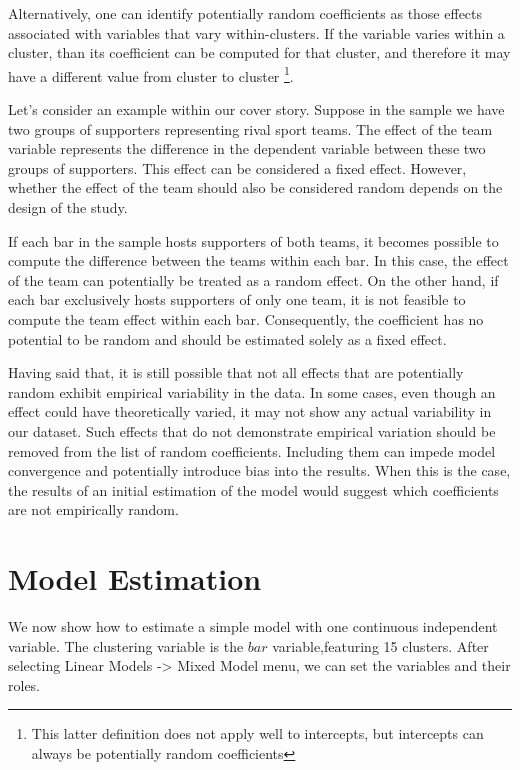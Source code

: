 \documentclass[
]{book}
\begin{document}
Alternatively, one can identify potentially random coefficients as those effects associated with variables that vary within-clusters. If the variable varies within a cluster, than its coefficient can be computed for that cluster, and therefore it may have a different value from cluster to cluster \footnote{This latter definition does not apply well to intercepts, but intercepts can always be potentially random coefficients}.

Let's consider an example within our cover story. Suppose in the sample we have two groups of supporters representing rival sport teams. The effect of the team variable represents the difference in the dependent variable between these two groups of supporters. This effect can be considered a fixed effect. However, whether the effect of the team should also be considered random depends on the design of the study.

If each bar in the sample hosts supporters of both teams, it becomes possible to compute the difference between the teams within each bar. In this case, the effect of the team can potentially be treated as a random effect. On the other hand, if each bar exclusively hosts supporters of only one team, it is not feasible to compute the team effect within each bar. Consequently, the coefficient has no potential to be random and should be estimated solely as a fixed effect.

Having said that, it is still possible that not all effects that are potentially random exhibit empirical variability in the data. In some cases, even though an effect could have theoretically varied, it may not show any actual variability in our dataset. Such effects that do not demonstrate empirical variation should be removed from the list of random coefficients. Including them can impede model convergence and potentially introduce bias into the results. When this is the case, the results of an initial estimation of the model would suggest which coefficients are not empirically random.

\hypertarget{model-estimation-3}{%
\section{Model Estimation}\label{model-estimation-3}}

We now show how to estimate a simple model with one continuous independent variable. The clustering variable is the \(bar\) variable,featuring 15 clusters. After selecting {Linear Models -\textgreater{} Mixed Model} menu, we can set the variables and their roles.
\end{document}

